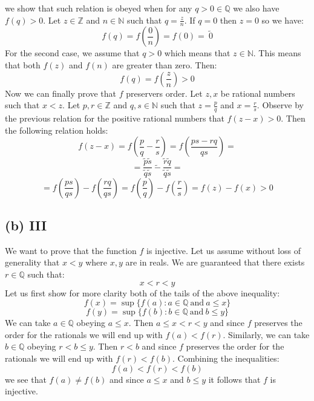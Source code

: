 \documentclass{article}
\begin{document}
we show that such relation is obeyed when for any \(q > 0 \in \mathbb{Q}\)
we also have \(f(q) > 0\). Let \(z \in \mathbb{Z}\) and \(n \in \mathbb{N}\) such that \(q = \frac{z}{n}\). If \(q = 0\)
then \(z = 0\) so we have:
\begin{equation*}
    f(q) = f(\frac{0}{n}) = f(0) = \ \tilde{0}
\end{equation*}
For the second case, we assume that \(q > 0\) which means that \(z \in \mathbb{N}\). This means that both \(f(z)\) and
\(f(n)\) are greater than zero. Then:
\begin{equation*}
    f(q) = f(\frac{z}{n}) > 0
\end{equation*}
Now we can finally prove that \(f\) preservers order. Let \(z, x\) be rational numbers such that \(x < z\).
Let \(p, r \in \mathbb{Z}\) and \(q, s \in \mathbb{N}\) such that 
\(z = \frac{p}{q}\) and \(x = \frac{r}{s}\). Observe by the previous relation for the positive
rational numbers that \(f(z - x) > 0\). Then the following relation holds:
\begin{equation*}
    f(z - x) = f(\frac{p}{q} - \frac{r}{s}) = f(\frac{ps - rq}{qs}) = 
\end{equation*}
\begin{equation*}
    = \frac{\tilde{p}\tilde{s}}{\tilde{q}\tilde{s}} \ \tilde{-} \ \frac{\tilde{r}\tilde{q}}{\tilde{q}\tilde{s}} = 
\end{equation*}
\begin{equation*}
    = f(\frac{ps}{qs}) - f(\frac{rq}{qs}) = f(\frac{p}{q}) - f(\frac{r}{s})  = f(z) - f(x) > 0
\end{equation*}



\subsection*{(b) III}

We want to prove that the function \(f\) is injective. Let us assume without loss of generality that \(x < y\) where
\(x, y\) are in reals. We are guaranteed that there exists \(r \in \mathbb{Q}\) such that:
\begin{equation*}
    x < r < y
\end{equation*}
Let us first show for more clarity both of the tails of the above inequality:
\begin{equation*}
    f(x) = \sup \{f(a) : a \in \mathbb{Q} \ \mbox{and} \ a \leq x\}
\end{equation*}
\begin{equation*}
    f(y) = \sup \{f(b) : b \in \mathbb{Q} \ \mbox{and} \ b \leq y\}
\end{equation*}
We can take \(a \in \mathbb{Q}\) obeying \(a \leq x\). Then \(a \leq x < r < y\) and since \(f\) preserves the order
for the rationals we will end up with \(f(a) < f(r)\). Similarly, we can take \(b \in \mathbb{Q}\) obeying \(r < b \leq y\).
Then \(r < b\) and since \(f\) preserves the order for the rationals we will end up with \(f(r) < f(b)\). Combining the inequalities:
\begin{equation*}
    f(a) < f(r) < f(b)
\end{equation*}
we see that \(f(a) \neq f(b)\) and since \(a \leq x\) and \(b \leq y\) it follows that \(f\) is injective.
\end{document}
